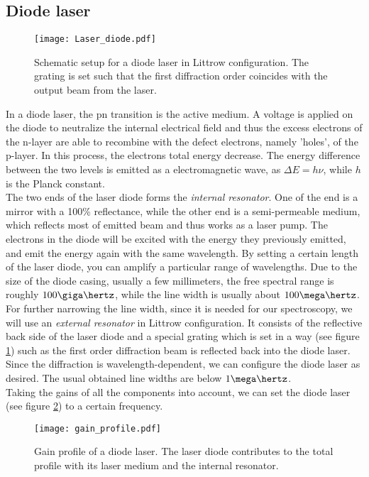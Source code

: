\subsection{Diode laser}
\begin{figure}[h]
	\centering
	\texttt{[image: Laser\_diode.pdf]}
	\caption{Schematic setup for a diode laser in Littrow configuration. The grating is set such that the first diffraction order coincides with the output beam from the laser.}
	\label{fig:laser_diode}
\end{figure}
In a diode laser, the pn transition is the active medium. A voltage is applied on the diode to neutralize the internal electrical field and thus the excess electrons of the n-layer are able to recombine with the defect electrons, namely 'holes', of the p-layer. In this process, the electrons total energy decrease. The energy difference between the two levels is emitted as a electromagnetic wave, as $\Delta E=h\nu$, while $h$ is the Planck constant.\\
The two ends of the laser diode forms the \emph{internal resonator}. One of the end is a mirror with a 100\% reflectance, while the other end is a semi-permeable medium, which reflects most of emitted beam and thus works as a laser pump. The electrons in the diode will be excited with the energy they previously emitted, and emit the energy again with the same wavelength. By setting a certain length of the laser diode, you can amplify a particular range of wavelengths. Due to the size of the diode casing, usually a few millimeters, the free spectral range is roughly $100\giga\hertz$, while the line width is usually about $100\mega\hertz$.\\
For further narrowing the line width, since it is needed for our spectroscopy, we will use an \emph{external resonator} in Littrow configuration. It consists of the reflective back side of the laser diode and a special grating which is set in a way (see figure \ref{fig:laser_diode}) such as the first order diffraction beam is reflected back into the diode laser. Since the diffraction is wavelength-dependent, we can configure the diode laser as desired. The usual obtained line widths are below $1\mega\hertz$.\\
Taking the gains of all the components into account, we can set the diode laser (see figure \ref{fig:gain_profiles}) to a certain frequency.
\begin{figure}[h]
	\centering
	\texttt{[image: gain\_profile.pdf]}
	\caption{Gain profile of a diode laser. The laser diode contributes to the total profile with its laser medium and the internal resonator. }
	\label{fig:gain_profiles}
\end{figure}
